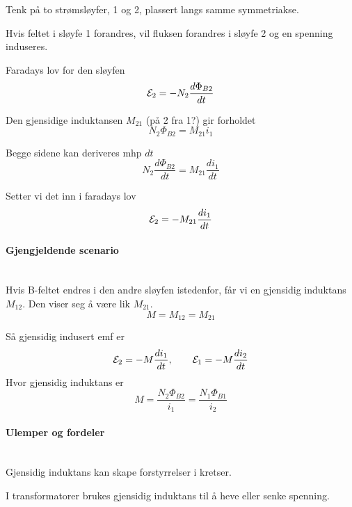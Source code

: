 Tenk på to strømsløyfer, 1 og 2, plassert langs samme symmetriakse.

Hvis feltet i sløyfe 1 forandres, vil fluksen forandres i sløyfe 2
og en spenning induseres.

Faradays lov for den sløyfen
$$\mathcal{E}_2 = -N_2 \frac{d\Phi_{B2}}{dt}$$

Den gjensidige induktansen $M_{21}$ (på 2 fra 1?) gir forholdet
$$N_2\Phi_{B2} = M_{21}i_1$$

Begge sidene kan deriveres mhp $dt$
$$N_2\frac{d\Phi_{B2}}{dt} = M_{21}\frac{di_1}{dt}$$

Setter vi det inn i faradays lov
$$\mathcal{E}_2 = - M_{21}\frac{di_1}{dt}$$



\paragraph{Gjengjeldende scenario} \hfill \\
Hvis B-feltet endres i den andre sløyfen istedenfor, får vi en
gjensidig induktans $M_{12}$.
Den viser seg å være lik $M_{21}$.
$$M = M_{12} = M_{21}$$

Så gjensidig indusert emf er
$$\mathcal{E}_2 = -M\frac{di_1}{dt}, \qquad
  \mathcal{E}_1 = -M\frac{di_2}{dt}$$
Hvor gjensidig induktans er
$$M = \frac{N_2\Phi_{B2}}{i_1}
    = \frac{N_1\Phi_{B1}}{i_2}$$



\paragraph{Ulemper og fordeler} \hfill \\
Gjensidig induktans kan skape forstyrrelser i kretser.

I transformatorer brukes gjensidig induktans til å heve eller senke spenning.
